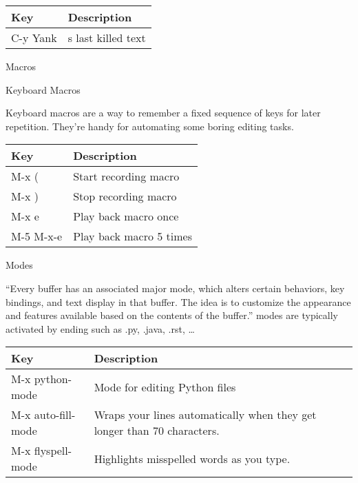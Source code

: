 \begin{longtable}[]{@{}ll@{}}
\toprule
Key & Description\tabularnewline
\midrule
\endhead
C-y Yank & s last killed text\tabularnewline
\bottomrule
\end{longtable}

Macros

Keyboard Macros

Keyboard macros are a way to remember a fixed sequence of keys for later
repetition. They're handy for automating some boring editing tasks.

\begin{longtable}[]{@{}ll@{}}
\toprule
Key & Description\tabularnewline
\midrule
\endhead
M-x ( & Start recording macro\tabularnewline
M-x ) & Stop recording macro\tabularnewline
M-x e & Play back macro once\tabularnewline
M-5 M-x-e & Play back macro 5 times\tabularnewline
\bottomrule
\end{longtable}

Modes

``Every buffer has an associated major mode, which alters certain
behaviors, key bindings, and text display in that buffer. The idea is to
customize the appearance and features available based on the contents of
the buffer.'' modes are typically activated by ending such as .py,
.java, .rst, \ldots{}

\begin{longtable}[]{@{}ll@{}}
\toprule
Key & Description\tabularnewline
\midrule
\endhead
M-x python-mode & Mode for editing Python files\tabularnewline
M-x auto-fill-mode & Wraps your lines automatically when they get longer
than 70 characters.\tabularnewline
M-x flyspell-mode & Highlights misspelled words as you
type.\tabularnewline
\bottomrule
\end{longtable}
